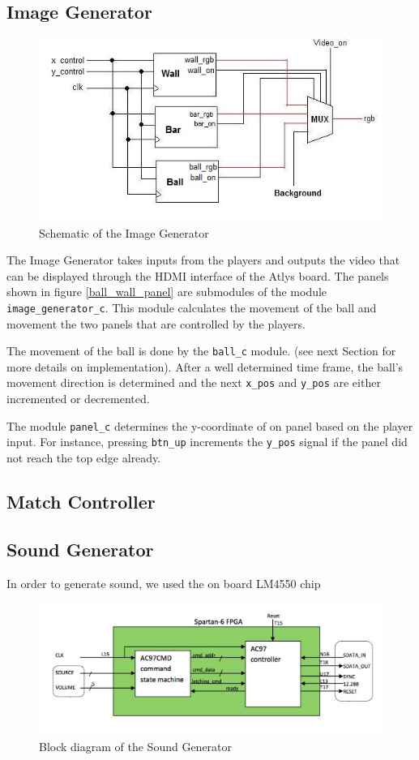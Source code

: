    \subsection{Image Generator}
	\begin{figure}[here]
		\centering
		\includegraphics[scale=0.7]{images/img_gen.jpg}
		\caption{Schematic of the Image Generator}
		\label{img_gen}
	\end{figure}
        The Image Generator takes inputs from the players and outputs the video that can be displayed through the HDMI interface of the Atlys board. The panels shown in figure \ref{ball_wall_panel} are submodules of the module \texttt{image\_generator\_c}.
		This module calculates the movement of the ball and movement the two panels that are controlled by the players. 
		
		The movement of the ball is done by the \texttt{ball\_c} module. (see next Section for more details on implementation).
		After a well determined time frame, the ball's movement direction is determined and the next \texttt{x\_pos} and \texttt{y\_pos} are either incremented or decremented. 
		
		The module \texttt{panel\_c} determines the y-coordinate of on panel based on the player input. For instance, pressing \texttt{btn\_up} increments the \texttt{y\_pos} signal if the panel did not reach the top edge already. 


    \subsection{Match Controller}
    \subsection{Sound Generator}
        In order to generate sound, we used the on board LM4550 chip
	\begin{figure}[here]
		\centering
		\includegraphics[scale=0.5]{images/snd_gen.jpg}
		\caption{Block diagram of the Sound Generator}
		\label{snd_gen}
	\end{figure}
